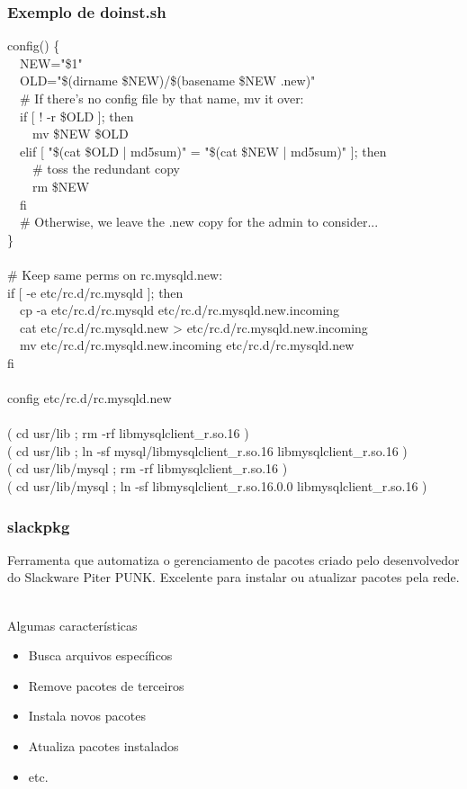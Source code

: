 \documentclass[aspectratio=169]{beamer}
\begin{document}
\begin{frame}
	\frametitle{Exemplo de doinst.sh}
	\scriptsize{
	\tiny{
	config() \{\\
  	~~NEW="\$1"\\
	~~OLD="\$(dirname \$NEW)/\$(basename \$NEW .new)"\\
	~~\# If there's no config file by that name, mv it over:\\
	~~if [ ! -r \$OLD ]; then\\
	~~~~mv \$NEW \$OLD\\
	~~elif [ "\$(cat \$OLD | md5sum)" = "\$(cat \$NEW | md5sum)" ]; then\\
        ~~~~\# toss the redundant copy\\
    	~~~~rm \$NEW\\
  	~~fi\\
  	~~\# Otherwise, we leave the .new copy for the admin to consider...\\
\}\\
~\\
	\# Keep same perms on rc.mysqld.new:\\
	if [ -e etc/rc.d/rc.mysqld ]; then\\
	~~cp -a etc/rc.d/rc.mysqld etc/rc.d/rc.mysqld.new.incoming\\
	~~cat etc/rc.d/rc.mysqld.new > etc/rc.d/rc.mysqld.new.incoming\\
	~~mv etc/rc.d/rc.mysqld.new.incoming etc/rc.d/rc.mysqld.new\\
	fi\\
~\\
	config etc/rc.d/rc.mysqld.new\\
~\\
	( cd usr/lib ; rm -rf libmysqlclient\_r.so.16 )\\
	( cd usr/lib ; ln -sf mysql/libmysqlclient\_r.so.16 libmysqlclient\_r.so.16 )\\
	( cd usr/lib/mysql ; rm -rf libmysqlclient\_r.so.16 )\\
	( cd usr/lib/mysql ; ln -sf libmysqlclient\_r.so.16.0.0 libmysqlclient\_r.so.16 )\\
	}}
\end{frame}

\begin{frame}
	\frametitle{slackpkg}
	Ferramenta que automatiza o gerenciamento de pacotes criado pelo desenvolvedor
	do Slackware Piter PUNK. Excelente para instalar ou atualizar pacotes pela
	rede.\\
	~\\
	\begin{block}{Algumas características}
		\begin{itemize}
			\item Busca arquivos específicos
			\item Remove pacotes de terceiros
			\item Instala novos pacotes
			\item Atualiza pacotes instalados
			\item etc.
		\end{itemize}
	\end{block}
\end{frame}
\end{document}

